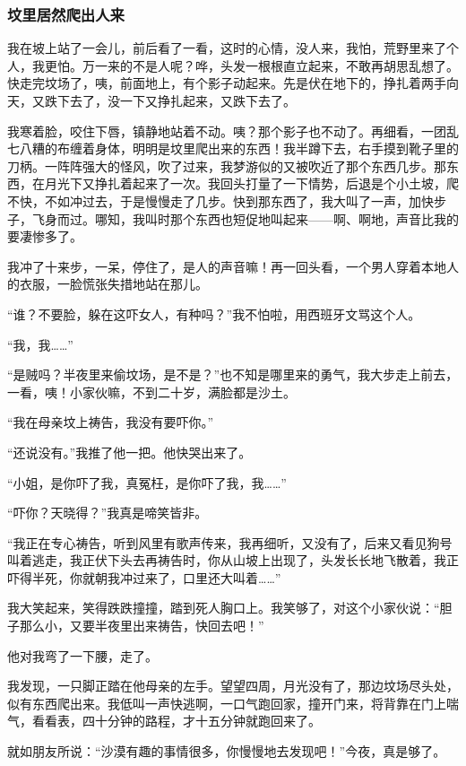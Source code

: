 \subsubsection*{坟里居然爬出人来}
\par 我在坡上站了一会儿，前后看了一看，这时的心情，没人来，我怕，荒野里来了个人，我更怕。万一来的不是人呢？哗，头发一根根直立起来，不敢再胡思乱想了。快走完坟场了，咦，前面地上，有个影子动起来。先是伏在地下的，挣扎着两手向天，又跌下去了，没一下又挣扎起来，又跌下去了。
\par 我寒着脸，咬住下唇，镇静地站着不动。咦？那个影子也不动了。再细看，一团乱七八糟的布缠着身体，明明是坟里爬出来的东西！我半蹲下去，右手摸到靴子里的刀柄。一阵阵强大的怪风，吹了过来，我梦游似的又被吹近了那个东西几步。那东西，在月光下又挣扎着起来了一次。我回头打量了一下情势，后退是个小土坡，爬不快，不如冲过去，于是慢慢走了几步。快到那东西了，我大叫了一声，加快步子，飞身而过。哪知，我叫时那个东西也短促地叫起来——啊、啊地，声音比我的要凄惨多了。
\par 我冲了十来步，一呆，停住了，是人的声音嘛！再一回头看，一个男人穿着本地人的衣服，一脸慌张失措地站在那儿。
\par “谁？不要脸，躲在这吓女人，有种吗？”我不怕啦，用西班牙文骂这个人。
\par “我，我……”
\par “是贼吗？半夜里来偷坟场，是不是？”也不知是哪里来的勇气，我大步走上前去，一看，咦！小家伙嘛，不到二十岁，满脸都是沙土。
\par “我在母亲坟上祷告，我没有要吓你。”
\par “还说没有。”我推了他一把。他快哭出来了。
\par “小姐，是你吓了我，真冤枉，是你吓了我，我……”
\par “吓你？天晓得？”我真是啼笑皆非。
\par “我正在专心祷告，听到风里有歌声传来，我再细听，又没有了，后来又看见狗号叫着逃走，我正伏下头去再祷告时，你从山坡上出现了，头发长长地飞散着，我正吓得半死，你就朝我冲过来了，口里还大叫着……”
\par 我大笑起来，笑得跌跌撞撞，踏到死人胸口上。我笑够了，对这个小家伙说：“胆子那么小，又要半夜里出来祷告，快回去吧！”
\par 他对我弯了一下腰，走了。
\par 我发现，一只脚正踏在他母亲的左手。望望四周，月光没有了，那边坟场尽头处，似有东西爬出来。我低叫一声快逃啊，一口气跑回家，撞开门来，将背靠在门上喘气，看看表，四十分钟的路程，才十五分钟就跑回来了。
\par 就如朋友所说：“沙漠有趣的事情很多，你慢慢地去发现吧！”今夜，真是够了。


